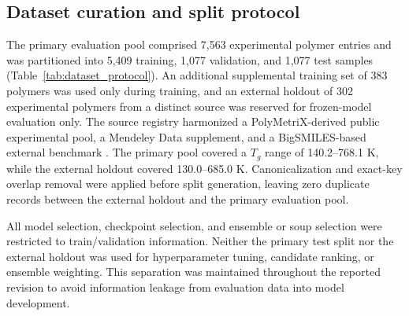 \documentclass[review,12pt]{elsarticle}
\begin{document}
\subsection{Dataset curation and split protocol}

The primary evaluation pool comprised 7,563 experimental polymer entries and was partitioned into 5,409 training, 1,077 validation, and 1,077 test samples (Table~\ref{tab:dataset_protocol}). An additional supplemental training set of 383 polymers was used only during training, and an external holdout of 302 experimental polymers from a distinct source was reserved for frozen-model evaluation only. The source registry harmonized a PolyMetriX-derived public experimental pool, a Mendeley Data supplement, and a BigSMILES-based external benchmark \cite{kunchapu2025polymetrix,liu2023mendeleytg,choi2024bigsmilesdata}. The primary pool covered a $T_g$ range of 140.2--768.1 K, while the external holdout covered 130.0--685.0 K. Canonicalization and exact-key overlap removal were applied before split generation, leaving zero duplicate records between the external holdout and the primary evaluation pool.

All model selection, checkpoint selection, and ensemble or soup selection were restricted to train/validation information. Neither the primary test split nor the external holdout was used for hyperparameter tuning, candidate ranking, or ensemble weighting. This separation was maintained throughout the reported revision to avoid information leakage from evaluation data into model development.

\begin{table}[t]
  \centering
  \caption{Dataset and evaluation protocol.}
  \label{tab:dataset_protocol}
\end{table}
\end{document}

